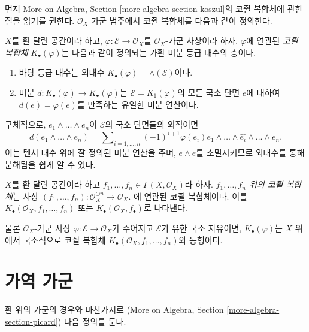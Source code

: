 \noindent
먼저 More on Algebra, Section \ref{more-algebra-section-koszul}의
코쥘 복합체에 관한 절을 읽기를 권한다.
$\mathcal{O}_X$-가군 범주에서 코쥘 복합체를 다음과 같이 정의한다.

\begin{definition}
\label{definition-koszul}
$X$를 환 달린 공간이라 하고, $\varphi : \mathcal{E} \to \mathcal{O}_X$를
$\mathcal{O}_X$-가군 사상이라 하자. $\varphi$에 연관된
{\it 코쥘 복합체} $K_\bullet(\varphi)$는 다음과 같이 정의되는
가환 미분 등급 대수의 층이다.
\begin{enumerate}
\item 바탕 등급 대수는 외대수
$K_\bullet(\varphi) = \wedge(\mathcal{E})$이다.
\item 미분 $d : K_\bullet(\varphi) \to K_\bullet(\varphi)$는
$\mathcal{E} = K_1(\varphi)$의 모든 국소 단면 $e$에 대하여
$d(e) = \varphi(e)$를 만족하는 유일한 미분 연산이다.
\end{enumerate}
\end{definition}

\noindent
구체적으로, $e_1 \wedge \ldots \wedge e_n$이 $\mathcal{E}$의
국소 단면들의 외적이면
$$
d(e_1 \wedge \ldots \wedge e_n) =
\sum\nolimits_{i = 1, \ldots, n} (-1)^{i + 1}
\varphi(e_i)e_1 \wedge \ldots \wedge \widehat{e_i} \wedge \ldots \wedge e_n.
$$
이는 텐서 대수 위에 잘 정의된 미분 연산을 주며, $e \wedge e$를
소멸시키므로 외대수를 통해 분해됨을 쉽게 알 수 있다.

\begin{definition}
\label{definition-koszul-complex}
$X$를 환 달린 공간이라 하고
$f_1, \ldots, f_n \in \Gamma(X, \mathcal{O}_X)$라 하자.
{\it $f_1, \ldots, f_n$ 위의 코쥘 복합체}는 사상
$(f_1, \ldots, f_n) : \mathcal{O}_X^{\oplus n} \to \mathcal{O}_X$.
에 연관된 코쥘 복합체이다. 이를
$K_\bullet(\mathcal{O}_X, f_1, \ldots, f_n)$ 또는
$K_\bullet(\mathcal{O}_X, f_\bullet)$로 나타낸다.
\end{definition}

\noindent
물론 $\mathcal{O}_X$-가군 사상
$\varphi : \mathcal{E} \to \mathcal{O}_X$가 주어지고
$\mathcal{E}$가 유한 국소 자유이면, $K_\bullet(\varphi)$는 $X$ 위에서
국소적으로 코쥘 복합체
$K_\bullet(\mathcal{O}_X, f_1, \ldots, f_n)$와 동형이다.



\section{가역 가군}
\label{section-invertible}

\noindent
환 위의 가군의 경우와 마찬가지로
(More on Algebra, Section \ref{more-algebra-section-picard})
다음 정의를 둔다.

